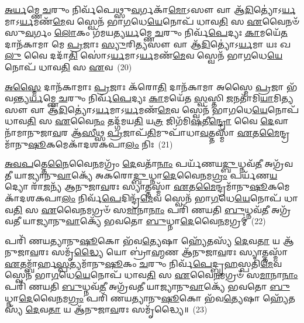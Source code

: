 \-\ul{𑌅}\-\-\ul{𑌰𑍍𑌯}\-𑌮𑍍𑌣𑍇 \ul{𑌚}\-𑌰𑍁𑌂 𑌨𑌿𑌰𑍍𑌵᳴𑌪𑍇𑌥𑍍𑌸𑍁\-\ul{𑌵}\-𑌰𑍍𑌗𑌕𑌾᳴\-\ul{𑌮𑍋}\-\-𑌽𑌸𑍗 𑌵𑌾 𑌆᳴\-\ul{𑌦𑌿}\-𑌤𑍍𑌯𑍋॑\-𑌽\-\ul{𑌰𑍍𑌯}\-𑌮𑌾\-𑌽\-\ul{𑌰𑍍𑌯}\-𑌮𑌣᳴\-\ul{𑌮𑍇}\-𑌵 𑌸𑍍𑌵𑍇𑌨᳴ 𑌭𑌾\-\ul{𑌗}\-𑌧𑍇\-\ul{𑌯𑍇}\-𑌨𑍋𑌪᳴ 𑌧𑌾𑌵\-\ul{𑌤𑌿} 𑌸 \ul{𑌏}\-𑌵𑍈𑌨𑍞᳴ 𑌸𑍁\-\ul{𑌵}\-𑌰𑍍𑌗𑌂 \ul{𑌲𑍋}\-𑌕𑌂 𑌗᳴𑌮𑌯𑌤𑍍𑌯\-\ul{𑌰𑍍𑌯}\-𑌮𑍍𑌣𑍇 \ul{𑌚}\-𑌰𑍁𑌂 𑌨𑌿𑌰𑍍𑌵᳴\-\ul{𑌪𑍇}\-𑌦𑍍𑌯𑌃 \ul{𑌕𑌾}\-𑌮𑌯𑍇᳴\-\ul{𑌤} 𑌦𑌾𑌨᳴𑌕𑌾𑌮𑌾 𑌮𑍇 \ul{𑌪𑍍𑌰}\-𑌜𑌾𑌃 \ul{𑌸𑍍𑌯𑍁}\-𑌰𑌿\-\ul{𑌤𑍍𑌯}\-𑌸𑍗 𑌵𑌾 𑌆᳴\-\ul{𑌦𑌿}\-𑌤𑍍𑌯𑍋॑\-𑌽\-\ul{𑌰𑍍𑌯}\-𑌮𑌾 𑌯𑌃 𑌖\-\ul{𑌲𑍁} 𑌵𑍈 𑌦𑌦𑌾᳴\-\ul{𑌤𑌿} 𑌸𑍋॑\-𑌽\-\ul{𑌰𑍍𑌯}\-𑌮𑌾\-𑌽\-\ul{𑌰𑍍𑌯}\-𑌮𑌣᳴\-\ul{𑌮𑍇}\-𑌵 𑌸𑍍𑌵𑍇𑌨᳴ 𑌭𑌾\-\ul{𑌗}\-𑌧𑍇\-\ul{𑌯𑍇}\-𑌨𑍋𑌪᳴ 𑌧𑌾𑌵\-\ul{𑌤𑌿} 𑌸 \ul{𑌏}\-𑌵~(20)

\-\ul{𑌅}\-\-\ul{𑌸𑍍𑌮𑍈} 𑌦𑌾𑌨᳴𑌕𑌾𑌮𑌾𑌃 \ul{𑌪𑍍𑌰}\-𑌜𑌾𑌃 𑌕᳴𑌰𑍋\-\ul{𑌤𑌿} 𑌦𑌾𑌨᳴𑌕𑌾𑌮𑌾 𑌅𑌸𑍍𑌮𑍈 \ul{𑌪𑍍𑌰}\-𑌜𑌾 𑌭᳴𑌵𑌨𑍍𑌤𑍍𑌯\-\ul{𑌰𑍍𑌯}\-𑌮𑍍𑌣𑍇 \ul{𑌚}\-𑌰𑍁𑌂 𑌨𑌿𑌰𑍍𑌵᳴\-\ul{𑌪𑍇}\-𑌦𑍍𑌯𑌃 \ul{𑌕𑌾}\-𑌮𑌯𑍇᳴𑌤 \ul{𑌸𑍍𑌵}\-𑌸𑍍𑌤𑌿 \ul{𑌜}\-𑌨𑌤𑌾᳴𑌮𑌿\-\ul{𑌯𑌾}\-𑌮𑌿\-\ul{𑌤𑍍𑌯}\-𑌸𑍗 𑌵𑌾 𑌆᳴\-\ul{𑌦𑌿}\-𑌤𑍍𑌯𑍋॑\-𑌽\-\ul{𑌰𑍍𑌯}\-𑌮𑌾\-𑌽\-\ul{𑌰𑍍𑌯}\-𑌮𑌣᳴\-\ul{𑌮𑍇}\-𑌵 𑌸𑍍𑌵𑍇𑌨᳴ 𑌭𑌾\-\ul{𑌗}\-𑌧𑍇\-\ul{𑌯𑍇}\-𑌨𑍋𑌪᳴ 𑌧𑌾𑌵\-\ul{𑌤𑌿} 𑌸 \ul{𑌏}\-𑌵𑍈\-\ul{𑌨𑌂} 𑌤𑌦𑍍𑌗᳴𑌮𑌯\-\ul{𑌤𑌿} 𑌯\-\ul{𑌤𑍍𑌰} 𑌜𑌿𑌗᳴𑌮𑌿\-\ul{𑌷}\-𑌤𑍀\-\ul{𑌨𑍍𑌦𑍍𑌰𑍋} 𑌵𑍈 \ul{𑌦𑍇}\-𑌵𑌾𑌨𑌾᳴𑌮𑌾𑌨𑍁𑌜𑌾\-\ul{𑌵}\-𑌰 𑌆᳴\-\ul{𑌸𑍀}\-𑌥𑍍𑌸 \ul{𑌪𑍍𑌰}\-𑌜𑌾𑌪᳴\-\ul{𑌤𑌿}\-𑌮𑍁𑌪𑌾᳴𑌧𑌾\-\ul{𑌵}\-𑌤𑍍𑌤𑌸𑍍𑌮𑌾᳴ \ul{𑌏}\-𑌤\-\ul{𑌮𑍈}\-𑌨𑍍𑌦𑍍𑌰𑌮𑌾᳴𑌨𑍁\-\ul{𑌷𑍂}\-𑌕𑌮𑍇𑌕𑌾᳴\-𑌦𑌶\-𑌕𑌪𑌾\-\ul{𑌲𑌂} 𑌨𑌿𑌃~(21)

\-\ul{𑌅}\-\-\ul{𑌵}\-\-\ul{𑌪}\-𑌤𑍍𑌤𑍇\-\ul{𑌨𑍈}\-𑌵𑍈\-\ul{𑌨}\-𑌮𑌗𑍍𑌰𑌂᳴ \ul{𑌦𑍇}\-𑌵𑌤𑌾᳴\-\ul{𑌨𑌾𑌂} 𑌪𑌰𑍍𑌯᳴𑌣𑌯\-\ul{𑌦𑍍𑌬𑍁}\-𑌧𑍍𑌨𑌵᳴\-\ul{𑌤𑍀} 𑌅𑌗𑍍𑌰᳴𑌵𑌤𑍀 𑌯𑌾𑌜𑍍𑌯𑌾𑌨𑍁\-\ul{𑌵𑌾}\-𑌕𑍍𑌯𑍇᳴ 𑌅𑌕𑌰𑍋\-\ul{𑌦𑍍𑌬𑍁}\-𑌧𑍍𑌨𑌾\-\ul{𑌦𑍇}\-𑌵𑍈\-\ul{𑌨}\-𑌮\-\ul{𑌗𑍍𑌰𑌂} 𑌪𑌰𑍍𑌯᳴𑌣\-\ul{𑌯}\-𑌦𑍍𑌯𑍋 𑌰𑌾᳴\-\ul{𑌜}\-𑌨𑍍𑌯᳴ 𑌆𑌨𑍁𑌜𑌾\-\ul{𑌵}\-𑌰𑌃 𑌸𑍍𑌯𑌾𑌤𑍍𑌤𑌸𑍍𑌮𑌾᳴ \ul{𑌏}\-𑌤\-\ul{𑌮𑍈}\-𑌨𑍍𑌦𑍍𑌰𑌮𑌾᳴𑌨𑍁\-\ul{𑌷𑍂}\-𑌕𑌮𑍇𑌕𑌾᳴\-𑌦𑌶\-𑌕𑌪𑌾\-\ul{𑌲𑌂} 𑌨𑌿𑌰𑍍𑌵᳴\-\ul{𑌪𑍇}\-𑌦𑌿𑌨𑍍𑌦𑍍𑌰᳴\-\ul{𑌮𑍇}\-𑌵 𑌸𑍍𑌵𑍇𑌨᳴ 𑌭𑌾\-\ul{𑌗}\-𑌧𑍇\-\ul{𑌯𑍇}\-𑌨𑍋𑌪᳴ 𑌧𑌾𑌵\-\ul{𑌤𑌿} 𑌸 \ul{𑌏}\-𑌵𑍈\-\ul{𑌨}\-𑌮𑌗𑍍𑌰𑍞᳴ 𑌸\-\ul{𑌮𑌾}\-𑌨𑌾\-\ul{𑌨𑌾𑌂} 𑌪𑌰𑌿᳴ 𑌣𑌯𑌤𑌿 \ul{𑌬𑍁}\-𑌧𑍍𑌨𑌵᳴\-\ul{𑌤𑍀} 𑌅𑌗𑍍𑌰᳴𑌵𑌤𑍀 𑌯𑌾𑌜𑍍𑌯𑌾𑌨𑍁\-\ul{𑌵𑌾}\-𑌕𑍍𑌯𑍇᳴ 𑌭𑌵𑌤𑍋 \ul{𑌬𑍁}\-𑌧𑍍𑌨𑌾\-\ul{𑌦𑍇}\-𑌵𑍈\-\ul{𑌨}\-𑌮𑌗𑍍𑌰𑌮𑍍॑~(22)

𑌪𑌰𑌿᳴ 𑌣𑌯𑌤𑍍𑌯𑌾𑌨𑍁\-\ul{𑌷𑍂}\-𑌕𑍋 𑌭᳴𑌵\-\ul{𑌤𑍍𑌯𑍇}\-𑌷𑌾 𑌹𑍍𑌯𑍇᳴𑌤𑌸𑍍𑌯᳴ \ul{𑌦𑍇}\-𑌵\-\ul{𑌤𑌾} 𑌯 𑌆᳴𑌨𑍁𑌜𑌾\-\ul{𑌵}\-𑌰𑌃 𑌸𑌮𑍃᳴\-\ul{𑌦𑍍𑌧𑍍𑌯𑍈} 𑌯𑍋 𑌬𑍍𑌰𑌾॑\-\ul{𑌹𑍍𑌮}\-𑌣 𑌆᳴𑌨𑍁𑌜𑌾\-\ul{𑌵}\-𑌰𑌃 𑌸𑍍𑌯𑌾𑌤𑍍𑌤𑌸𑍍𑌮𑌾᳴ \ul{𑌏}\-𑌤𑌮𑍍𑌬𑌾᳴𑌰𑍍\mbox{}𑌹\-\ul{𑌸𑍍𑌪}\-𑌤𑍍𑌯𑌮𑌾᳴𑌨𑍁\-\ul{𑌷𑍂}\-𑌕𑌂 \ul{𑌚}\-𑌰𑍁𑌂 𑌨𑌿𑌰𑍍𑌵᳴\-\ul{𑌪𑍇}\-𑌦𑍍𑌬𑍃\-\ul{𑌹}\-𑌸𑍍𑌪𑌤𑌿᳴\-\ul{𑌮𑍇}\-𑌵 𑌸𑍍𑌵𑍇𑌨᳴ 𑌭𑌾\-\ul{𑌗}\-𑌧𑍇\-\ul{𑌯𑍇}\-𑌨𑍋𑌪᳴ 𑌧𑌾𑌵\-\ul{𑌤𑌿} 𑌸 \ul{𑌏}\-𑌵𑍈\-\ul{𑌨}\-𑌮𑌗𑍍𑌰𑍞᳴ 𑌸\-\ul{𑌮𑌾}\-𑌨𑌾\-\ul{𑌨𑌾𑌂} 𑌪𑌰𑌿᳴ 𑌣𑌯𑌤𑌿 \ul{𑌬𑍁}\-𑌧𑍍𑌨𑌵᳴\-\ul{𑌤𑍀} 𑌅𑌗𑍍𑌰᳴𑌵𑌤𑍀 𑌯𑌾𑌜𑍍𑌯𑌾𑌨𑍁\-\ul{𑌵𑌾}\-𑌕𑍍𑌯𑍇᳴ 𑌭𑌵𑌤𑍋 \ul{𑌬𑍁}\-𑌧𑍍𑌨𑌾\-\ul{𑌦𑍇}\-𑌵𑍈\-\ul{𑌨}\-𑌮\-\ul{𑌗𑍍𑌰𑌂} 𑌪𑌰𑌿᳴ 𑌣𑌯𑌤𑍍𑌯𑌾𑌨𑍁\-\ul{𑌷𑍂}\-𑌕𑍋 𑌭᳴𑌵\-\ul{𑌤𑍍𑌯𑍇}\-𑌷𑌾 𑌹𑍍𑌯𑍇᳴𑌤𑌸𑍍𑌯᳴ \ul{𑌦𑍇}\-𑌵\-\ul{𑌤𑌾} 𑌯 𑌆᳴𑌨𑍁𑌜𑌾\-\ul{𑌵}\-𑌰𑌃 𑌸𑌮𑍃᳴𑌦𑍍𑌧𑍍𑌯𑍈॥~(23)

